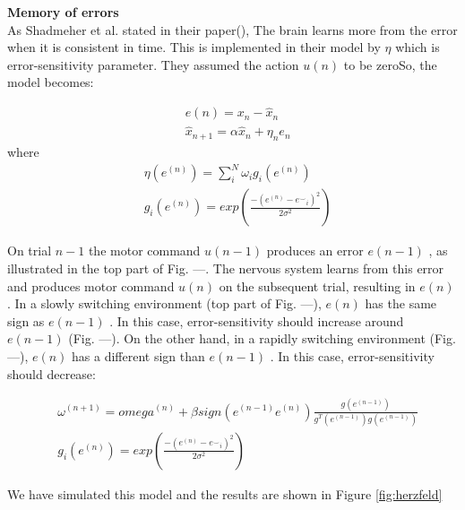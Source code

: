 \documentclass[9pt,twocolumn]{paper-template}
\begin{document}
\textbf{Memory of errors}\\

As Shadmeher et al. stated in their paper(\cite{mem_of_error}), The brain learns more from the error when it is consistent in time. This is implemented in their model by $\eta$ which is error-sensitivity parameter. They assumed the action $u(n)$ to be zeroSo, the model becomes:

\begin{eqnarray*}
& e(n) = x_n-\hat{x}_n\\
& \hat{x}_{n+1} = \alpha \hat{x}_n + \eta_ne_n
\end{eqnarray*}
where
\begin{eqnarray*}
& \eta(e^{(n)}) = \sum_i^N \omega_ig_i(e^{(n)})\\
&g_i(e^{(n)}) = exp(\frac{-(e^{(n)}-{e^\smallsmile}_i)^2}{2\sigma^2})
\end{eqnarray*}


On trial $n-1$ the motor command $u(n-1)$ produces an error $e(n-1)$ , as illustrated in the top part of Fig. ---. The nervous system learns from this error and produces motor command $u (n)$ on the subsequent trial, resulting in $e(n)$ . In a slowly switching environment (top part of Fig. ---), $e(n)$ has the same sign as $e(n-1)$ . In this case, error-sensitivity should increase around $e(n-1)$ (Fig. ---). On the other hand, in a rapidly switching environment (Fig. ---), $e(n)$ has a different sign than $e(n-1)$ . In this case, error-sensitivity should decrease:

\begin{eqnarray*}
& \omega^{(n+1)} =omega^{(n)}+\beta sign(e^{(n-1)}e^{(n)}) \frac{g(e^{(n-1)})}{g^T(e^{(n-1)})g(e^{(n-1)})}\\
&g_i(e^{(n)}) = exp(\frac{-(e^{(n)}-{e^\smallsmile}_i)^2}{2\sigma^2})
\end{eqnarray*}

We have simulated this model and the results are shown in Figure \ref{fig:herzfeld}
\end{document}
